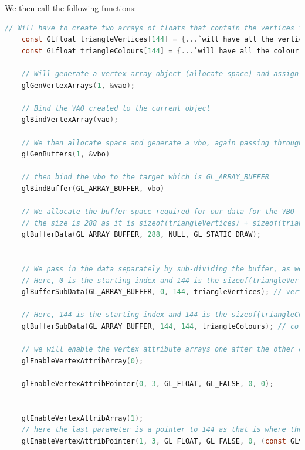 \documentclass[10pt]{report}
\begin{document}
We then call the following functions:
\begin{lstlisting}[language=c]
    // Will have to create two arrays of floats that contain the vertices for all the triangles and the colours for all the triangles both size 10 
    const GLfloat triangleVertices[144] = {...`will have all the vertices here as floats`...}
    const GLfloat triangleColours[144] = {...`will have all the colour data here as floats`...}

    // Will generate a vertex array object (allocate space) and assign it to vao. We pass through a reference so that it will change the variable.
    glGenVertexArrays(1, &vao);

    // Bind the VAO created to the current object
    glBindVertexArray(vao);

    // We then allocate space and generate a vbo, again passing through a reference
    glGenBuffers(1, &vbo)

    // then bind the vbo to the target which is GL_ARRAY_BUFFER
    glBindBuffer(GL_ARRAY_BUFFER, vbo)

    // We allocate the buffer space required for our data for the VBO
    // the size is 288 as it is sizeof(triangleVertices) + sizeof(triangleColors)
    glBufferData(GL_ARRAY_BUFFER, 288, NULL, GL_STATIC_DRAW);


    // We pass in the data separately by sub-dividing the buffer, as we would like to allocate vertices and color to the same buffer. This could be done so that you create two separate buffers and VBOs like seen on https://www.khronos.org/opengl/wiki/Tutorial2:_VAOs,_VBOs,_Vertex_and_Fragment_Shaders_(C_/_SDL)#Compilation
    // Here, 0 is the starting index and 144 is the sizeof(triangleVertices)
    glBufferSubData(GL_ARRAY_BUFFER, 0, 144, triangleVertices); // vertices
    
    // Here, 144 is the starting index and 144 is the sizeof(triangleColours)
    glBufferSubData(GL_ARRAY_BUFFER, 144, 144, triangleColours); // colours

    // we will enable the vertex attribute arrays one after the other creating the correct 
    glEnableVertexAttribArray(0);
    
    glEnableVertexAttribPointer(0, 3, GL_FLOAT, GL_FALSE, 0, 0);
    
    
    glEnableVertexAttribArray(1);
    // here the last parameter is a pointer to 144 as that is where the colour data starts in the buffer
    glEnableVertexAttribPointer(1, 3, GL_FLOAT, GL_FALSE, 0, (const GLvoid*) 144);

    
\end{lstlisting}
\end{document}
